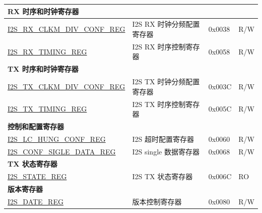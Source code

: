 \begin{longtable}{ | p{6cm} | p{7.2cm} | p{1.3cm} | p{1cm} | }
\multicolumn{4}{|l|}{\textbf{RX 时序和时钟寄存器}} \\ \hline
\hyperref[regdesc:I2SRXCLKMDIVCONFREG]{I2S\_RX\_CLKM\_DIV\_CONF\_REG} & I2S RX 时钟分频配置寄存器 & 0x0038 & R/W \\ \hline
\hyperref[regdesc:I2SRXTIMINGREG]{I2S\_RX\_TIMING\_REG} & I2S RX 时序控制寄存器 & 0x0058 & R/W \\ \hline
\multicolumn{4}{|l|}{\textbf{TX 时序和时钟寄存器}} \\ \hline
\hyperref[regdesc:I2STXCLKMDIVCONFREG]{I2S\_TX\_CLKM\_DIV\_CONF\_REG} & I2S TX 时钟分频配置寄存器 & 0x003C & R/W \\ \hline
\hyperref[regdesc:I2STXTIMINGREG]{I2S\_TX\_TIMING\_REG} & I2S TX 时序控制寄存器 & 0x005C & R/W \\ \hline
\multicolumn{4}{|l|}{\textbf{控制和配置寄存器}} \\ \hline
\hyperref[regdesc:I2SLCHUNGCONFREG]{I2S\_LC\_HUNG\_CONF\_REG} & I2S 超时配置寄存器 & 0x0060 & R/W \\ \hline
\hyperref[regdesc:I2SCONFSIGLEDATAREG]{I2S\_CONF\_SIGLE\_DATA\_REG} & I2S single 数据寄存器 & 0x0068 & R/W \\ \hline
\multicolumn{4}{|l|}{\textbf{TX 状态寄存器}} \\ \hline
\hyperref[regdesc:I2SSTATEREG]{I2S\_STATE\_REG} & I2S TX 状态寄存器 & 0x006C & RO \\ \hline
\multicolumn{4}{|l|}{\textbf{版本寄存器}} \\ \hline
\hyperref[regdesc:I2SDATEREG]{I2S\_DATE\_REG} & 版本控制寄存器 & 0x0080 & R/W \\ \hline
\end{longtable}
